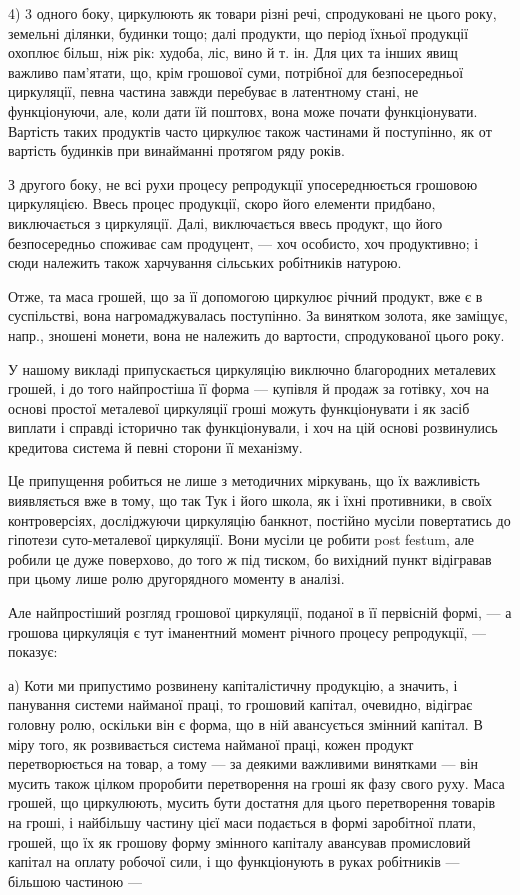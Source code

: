 4) 3 одного боку, циркулюють як товари різні речі, спродуковані
не цього року, земельні ділянки, будинки тощо; далі продукти, що
період їхньої продукції охоплює більш, ніж рік: худоба, ліс, вино й т. ін.
Для цих та інших явищ важливо пам’ятати, що, крім грошової суми,
потрібної для безпосередньої циркуляції, певна частина завжди перебуває
в латентному стані, не функціонуючи, але, коли дати їй поштовх, вона
може почати функціонувати. Вартість таких продуктів часто циркулює
також частинами й поступінно, як от вартість будинків при винайманні
протягом ряду років.

З другого боку, не всі рухи процесу репродукції упосереднюється
грошовою циркуляцією. Ввесь процес продукції, скоро його елементи
придбано, виключається з циркуляції. Далі, виключається ввесь продукт,
що його безпосередньо споживає сам продуцент, — хоч особисто, хоч
продуктивно; і сюди належить також харчування сільських робітників
натурою.

Отже, та маса грошей, що за її допомогою циркулює річний продукт,
вже є в суспільстві, вона нагромаджувалась поступінно. За винятком золота,
яке заміщує, напр., зношені монети, вона не належить до вартости,
спродукованої цього року.

У нашому викладі припускається циркуляцію виключно благородних
металевих грошей, і до того найпростіша її форма — купівля й продаж
за готівку, хоч на основі простої металевої циркуляції гроші можуть
функціонувати і як засіб виплати і справді історично так функціонували,
і хоч на цій основі розвинулись кредитова система й певні сторони
її механізму.

Це припущення робиться не лише з методичних міркувань, що їх важливість
виявляється вже в тому, що так Тук і його школа, як і їхні противники,
в своїх контроверсіях, досліджуючи циркуляцію банкнот, постійно
мусіли повертатись до гіпотези суто-металевої циркуляції. Вони мусіли
це робити post festum, але робили це дуже поверхово, до того ж під
тиском, бо вихідний пункт відігравав при цьому лише ролю другорядного
моменту в аналізі.

Але найпростіший розгляд грошової циркуляції, поданої в її первісній
формі, — а грошова циркуляція є тут іманентний момент річного процесу
репродукції, — показує:

а) Коти ми припустимо розвинену капіталістичну продукцію, а значить,
і панування системи найманої праці, то грошовий капітал, очевидно,
відіграє головну ролю, оскільки він є форма, що в ній авансується
змінний капітал. В міру того, як розвивається система найманої праці,
кожен продукт перетворюється на товар, а тому — за деякими важливими
винятками — він мусить також цілком проробити перетворення на
гроші як фазу свого руху. Маса грошей, що циркулюють, мусить бути
достатня для цього перетворення товарів на гроші, і найбільшу частину
цієї маси подається в формі заробітної плати, грошей, що їх як грошову
форму змінного капіталу авансував промисловий капітал на оплату робочої
сили, і що функціонують в руках робітників — більшою частиною —
